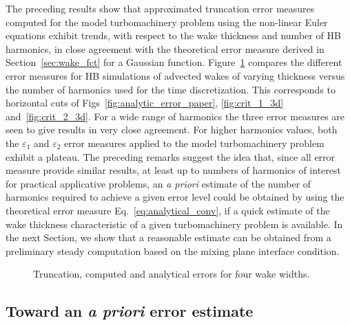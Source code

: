The preceding results show that approximated truncation error 
measures computed for the model turbomachinery problem 
using the non-linear Euler equations
exhibit trends, with respect to the wake thickness 
and number of HB harmonics, in close agreement with the 
theoretical error measure derived in Section~\ref{sec:wake_fct}
for a Gaussian function. 
Figure~\ref{fig:error_comp_curves} compares the 
different error measures for HB simulations of 
advected wakes of varying thickness versus 
the number of harmonics used for the time discretization. 
This corresponds to horizontal cuts of Figs~\ref{fig:analytic_error_paper}, 
\ref{fig:crit_1_3d} and~\ref{fig:crit_2_3d}. 
For a wide range of harmonics 
the three error measures are seen to give 
results in very close agreement. For higher harmonics values, 
both the $\varepsilon_1$ and $\varepsilon_2$ error 
measures applied to the model turbomachinery problem 
exhibit a plateau.
The preceding remarks suggest the idea that, 
since all error measure provide similar results, 
at least up to numbers of harmonics of interest for 
practical applicative problems, an \emph{a priori} 
estimate of the number of harmonics required 
to achieve a given error level could be 
obtained by using the theoretical error measure 
Eq.~\eqref{eq:analytical_conv}, if a quick 
estimate of the wake thickness characteristic 
of a given turbomachinery problem is available. 
In the next Section, we show that a reasonable 
estimate can be obtained from a preliminary steady 
computation based on the mixing plane interface condition.
\begin{figure}[htp]
  \centering
  \quad
  \quad
  \quad
  \quad
  \caption{Truncation, computed and analytical errors for four wake widths.}
  \label{fig:error_comp_curves}
\end{figure}

\subsection{Toward an \emph{a priori} error estimate}
\label{sub:prediction_tool_azimuthal_fft}

